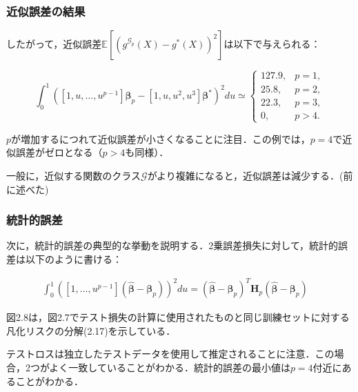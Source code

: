 \documentclass[dvipdfmx,cjk]{beamer}
\theoremstyle{example}
\begin{document}
\begin{frame}
    \frametitle{近似誤差の結果}
    したがって，近似誤差$\mathbb{E}[(g^{\mathcal{G}_p}(X) - g^*(X))^2]$は以下で与えられる：

    \[
        \int_0^{1} ([1, u, ..., u^{p-1}]\boldsymbol{\beta}_p - [1, u, u^2, u^3]\boldsymbol{\beta}^*)^2 du \simeq
        \begin{cases}
            127.9, & p = 1, \\
            25.8,  & p = 2, \\
            22.3,  & p = 3, \\
            0,     & p > 4.
        \end{cases}
        \tag{2.19}
    \]

    $p$が増加するにつれて近似誤差が小さくなることに注目．この例では，$p = 4$で近似誤差がゼロとなる（$p > 4$も同様）．

    一般に，近似する関数のクラス$\mathcal{G}$がより複雑になると，近似誤差は減少する．(前に述べた)
\end{frame}


\begin{frame}
    \frametitle{統計的誤差}
    次に，統計的誤差の典型的な挙動を説明する．2乗誤差損失に対して，統計的誤差は以下のように書ける：

    \begin{align*}
        \int_0^{1} ([1, ..., u^{p-1}](\hat{\boldsymbol{\beta}}-\boldsymbol{\beta}_p))^2du= (\hat{\boldsymbol{\beta}}-\boldsymbol{\beta}_p)^T\mathbf{H}_p (\hat{\boldsymbol{\beta}}-\boldsymbol{\beta}_p) \quad \tag{2.20}
    \end{align*}

    図2.8は，図2.7でテスト損失の計算に使用されたものと同じ訓練セットに対する凡化リスクの分解(2.17)を示している．

    テストロスは独立したテストデータを使用して推定されることに注意．この場合，2つがよく一致していることがわかる．統計的誤差の最小値は$p = 4$付近にあることがわかる．
\end{frame}
\end{document}
